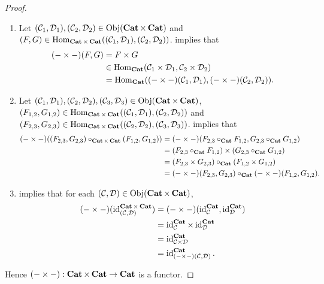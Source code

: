 \documentclass{book}
\begin{document}
	\begin{proof}\
		\begin{enumerate}
			\item Let $(\MC_1, \MD_1), (\MC_2, \MD_2) \in \Obj(\bCat \times \bCat)$ and $(F,G) \in \Hom_{\bCat \times \bCat}((\MC_1, \MD_1), (\MC_2, \MD_2))$.  implies that 
			\begin{align*}
				(- \times -)(F,G)
				& = F \times G \\
				& \in \Hom_{\bCat}(\MC_1 \times \MD_1, \MC_2 \times \MD_2) \\
				& = \Hom_{\bCat}((- \times -)(\MC_1, \MD_1), (- \times -)(\MC_2, \MD_2)).
			\end{align*}
			\item Let $(\MC_1, \MD_1), (\MC_2, \MD_2), (\MC_3, \MD_3) \in \Obj(\bCat \times \bCat)$, $(F_{1,2},G_{1,2}) \in \Hom_{\bCat \times \bCat}((\MC_1, \MD_1), (\MC_2, \MD_2))$ and $(F_{2,3},G_{2,3}) \in \Hom_{\bCat \times \bCat}((\MC_2, \MD_2), (\MC_3, \MD_3))$.  implies that
			\begin{align*}
				(- \times -)((F_{2,3},G_{2,3}) \circ_{\bCat \times \bCat} (F_{1,2},G_{1,2}))
				& = (- \times -)(F_{2,3} \circ_{\bCat} F_{1,2}, G_{2,3} \circ_{\bCat} G_{1,2}) \\
				& = (F_{2,3} \circ_{\bCat} F_{1,2}) \times (G_{2,3} \circ_{\bCat} G_{1,2}) \\
				& = (F_{2,3} \times G_{2,3}) \circ_{\bCat} (F_{1,2} \times G_{1,2}) \\
				& = (- \times -)(F_{2,3}, G_{2,3}) \circ_{\bCat} (- \times -)(F_{1,2}, G_{1,2}).
			\end{align*} 
			\item {} implies that for each $(\MC, \MD) \in \Obj(\bCat \times \bCat)$, 
			\begin{align*}
				(- \times -)(\id_{(\MC, \MD)}^{\bCat \times \bCat})
				& = (- \times -)(\id_{\MC}^{\bCat}, \id_{\MD}^{\bCat}) \\
				& = \id_{\MC}^{\bCat} \times \id_{\MD}^{\bCat} \\
				& = \id_{\MC \times \MD}^{\bCat} \\
				& = \id_{(- \times -)(\MC, \MD)}^{\bCat}.
			\end{align*}
		\end{enumerate}
		Hence $(- \times -): \bCat \times \bCat \rightarrow \bCat$ is a functor.
	\end{proof}
	
\end{document}
